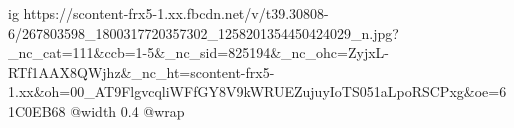  
 
 
 
 

\ifcmt
  ig https://scontent-frx5-1.xx.fbcdn.net/v/t39.30808-6/267803598_1800317720357302_1258201354450424029_n.jpg?_nc_cat=111&ccb=1-5&_nc_sid=825194&_nc_ohc=ZyjxL-RTf1AAX8QWjhz&_nc_ht=scontent-frx5-1.xx&oh=00_AT9FlgvcqliWFfGY8V9kWRUEZujuyIoTS051aLpoRSCPxg&oe=61C0EB68
  @width 0.4
  @wrap 
\fi
